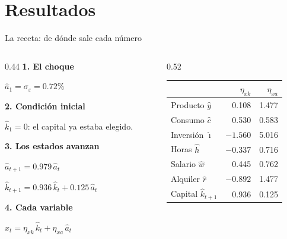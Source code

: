 \section{Resultados}

\begin{frame}[label=receta]{La receta: de dónde sale cada número}
  \begin{columns}[T,onlytextwidth]
    \begin{column}{0.44\textwidth}
      \small
      \textbf{1. El choque}\par
      $\hat a_1=\sigma_\varepsilon=0.72\%$\par
      \vspace{0.25cm}
      \textbf{2. Condición inicial}\par
      $\hat k_1=0$: el capital ya estaba elegido.\par
      \vspace{0.25cm}
      \textbf{3. Los estados avanzan}\par
      $\hat a_{t+1}=0.979\,\hat a_t$\par
      $\hat k_{t+1}=0.936\,\hat k_t+0.125\,\hat a_t$\par
      \vspace{0.25cm}
      \textbf{4. Cada variable}\par
      $\hat x_t=\eta_{xk}\,\hat k_t+\eta_{xa}\,\hat a_t$
    \end{column}
    \begin{column}{0.52\textwidth}
      \centering\small
      \renewcommand{\arraystretch}{1.2}
      \begin{tabular}{@{}lrr@{}}
        \toprule
        & $\eta_{xk}$ & $\eta_{xa}$\\
        \midrule
        Producto $\hat y$ & 0.108 & 1.477\\
        Consumo $\hat c$ & 0.530 & 0.583\\
        Inversión $\hat\imath$ & $-1.560$ & 5.016\\
        Horas $\hat h$ & $-0.337$ & 0.716\\
        Salario $\hat w$ & 0.445 & 0.762\\
        Alquiler $\hat r$ & $-0.892$ & 1.477\\
        Capital $\hat k_{t+1}$ & 0.936 & 0.125\\
        \bottomrule
      \end{tabular}
    \end{column}
  \end{columns}
\end{frame}

